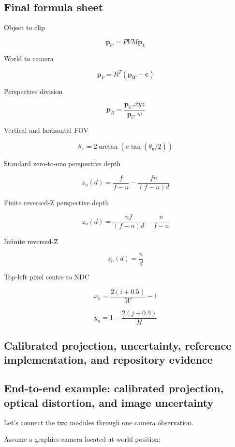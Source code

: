 \subsection{Final formula sheet}\label{02-foundations-ii-ch037-final-formula-sheet}

Object to clip

\[
 \boxed{ \mathbf p_C=PVM\mathbf p_L }
\]

World to camera

\[
 \boxed{ \mathbf p_V=R^T(\mathbf p_W-\mathbf c) }
\]

Perspective division

\[
 \boxed{ \mathbf p_N= \frac{\mathbf p_C.xyz}{\mathbf p_C.w} }
\]

Vertical and horizontal FOV

\[
 \boxed{ \theta_x= 2\arctan \left( a\tan(\theta_y/2) \right) }
\]

Standard zero-to-one perspective depth

\[
 \boxed{ z_n(d)= \frac f{f-n} - \frac{fn}{(f-n)d} }
\]

Finite reversed-Z perspective depth

\[
 \boxed{ z_n(d)= \frac{nf}{(f-n)d} - \frac n{f-n} }
\]

Infinite reversed-Z

\[
 \boxed{ z_n(d)=\frac nd }
\]

Top-left pixel centre to NDC

\[
 \boxed{ x_n=\frac{2(i+0.5)}W-1 }
\]

\[
 \boxed{ y_n=1-\frac{2(j+0.5)}H }
\]

\subsection{Calibrated projection, uncertainty, reference implementation, and repository evidence}\label{02-foundations-ii-ch037-calibrated-projection-uncertainty-reference-implementation-and-repository-evidence}

\subsection{End-to-end example: calibrated projection, optical distortion, and image uncertainty}\label{02-foundations-ii-ch037-end-to-end-example-calibrated-projection-optical-distortion-and-image-uncertainty}

Let's connect the two modules through one camera observation.

Assume a graphics camera located at world position:

